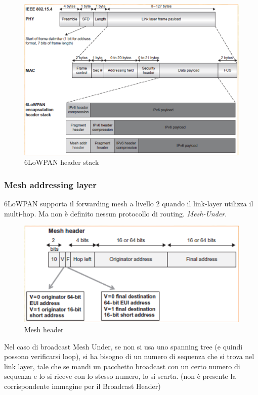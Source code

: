 \documentclass{article}
\begin{document}
\begin{figure}[H]
\centering
\includegraphics[scale=0.5]{figures/6lowpan header stack 2.png}
\caption{6LoWPAN header stack}
\end{figure}

\subsubsection{Mesh addressing layer}
6LoWPAN supporta il forwarding mesh a livello 2 quando il link-layer utilizza il multi-hop. Ma non è definito nessun protocollo di routing. \textit{Mesh-Under}.
\begin{figure}[H]
\centering
\includegraphics[scale=0.5]{figures/mesh header.png}
\caption{Mesh header}
\end{figure}
Nel caso di broadcast Mesh Under, se non si usa uno spanning tree (e quindi possono verificarsi loop), si ha bisogno di un numero di sequenza che si trova nel link layer, tale che se mandi un pacchetto broadcast con un certo numero di sequenza e lo si riceve con lo stesso numero, lo si scarta. (non è presente la corrispondente immagine per il Broadcast Header)
\end{document}
